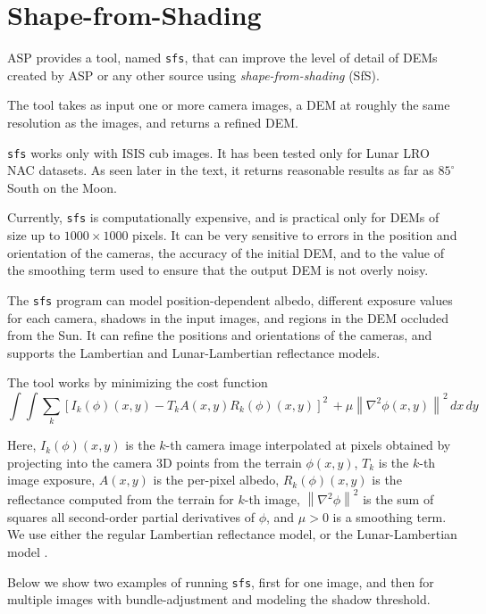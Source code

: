 \chapter{Shape-from-Shading}
\label{ch:sfs}

ASP provides a tool, named \texttt{sfs}, that can improve the level of
detail of DEMs created by ASP or any other source using
\textit{shape-from-shading} (SfS).

The tool takes as input one or more camera images, a DEM at roughly the
same resolution as the images, and returns a refined DEM.

\texttt{sfs} works only with ISIS cub images. It has been tested only
for Lunar LRO NAC datasets. As seen later in the text, it returns reasonable
results as far as $85^\circ$ South on the Moon.

Currently, \texttt{sfs} is computationally expensive, and is practical
only for DEMs of size up to $1000\times 1000$ pixels. It can be very
sensitive to errors in the position and orientation of the cameras, the
accuracy of the initial DEM, and to the value of the smoothing term used
to ensure that the output DEM is not overly noisy.

The \texttt{sfs} program can model position-dependent albedo, different
exposure values for each camera, shadows in the input images, and regions
in the DEM occluded from the Sun. It can refine the positions and orientations
of the cameras, and supports the Lambertian and Lunar-Lambertian reflectance
models.

The tool works by minimizing the cost function
$$
\int\!\! \int \! \sum_k \left[ I_k(\phi)(x, y) - T_k A(x, y)
  R_k(\phi)(x, y) \right]^2\, + \mu
\left\|\nabla^2 \phi(x, y) \right\|^2 \, dx\, dy
$$

Here, $I_k(\phi)(x, y)$ is the $k$-th camera image interpolated at
pixels obtained by projecting into the camera 3D points from the terrain
$\phi(x, y)$, $T_k$ is the $k$-th image exposure, $A(x, y)$ is the
per-pixel albedo, $R_k(\phi)(x, y)$ is the reflectance computed from the
terrain for $k$-th image, $\left\|\nabla^2 \phi \right\|^2 $ is the sum
of squares all second-order partial derivatives of $\phi$, and $\mu > 0$
is a smoothing term. We use either the regular Lambertian reflectance model,
or the Lunar-Lambertian model \cite{mcewen1991photometric}.

Below we show two examples of running \texttt{sfs}, first for one image,
and then for multiple images with bundle-adjustment and modeling the shadow
threshold.


